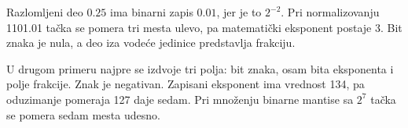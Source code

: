 Razlomljeni deo $0.25$ ima binarni zapis $0.01$, jer je to $2^{-2}$. Pri normalizovanju 1101.01 tačka se pomera tri mesta ulevo, pa matematički eksponent postaje 3. Bit znaka je nula, a deo iza vodeće jedinice predstavlja frakciju.

U drugom primeru najpre se izdvoje tri polja: bit znaka, osam bita eksponenta i polje frakcije. Znak je negativan. Zapisani eksponent ima vrednost 134, pa oduzimanje pomeraja 127 daje sedam. Pri množenju binarne mantise sa $2^7$ tačka se pomera sedam mesta udesno.
